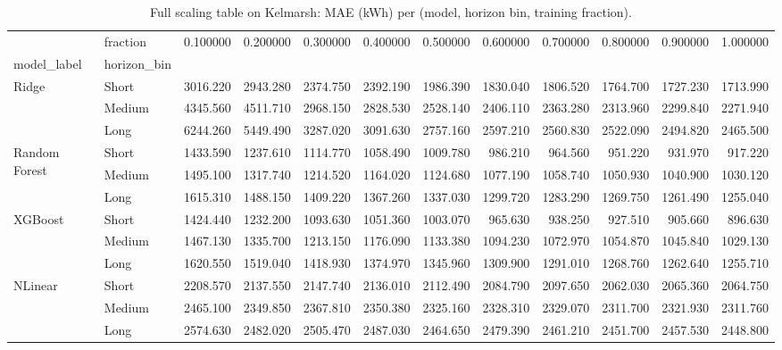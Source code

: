 \begin{table}[ht]
\caption{Full scaling table on Kelmarsh: MAE (kWh) per (model, horizon bin, training fraction).}
\label{tab:app_scaling_full}
\begin{tabular}{llrrrrrrrrrr}
\toprule
 & fraction & 0.100000 & 0.200000 & 0.300000 & 0.400000 & 0.500000 & 0.600000 & 0.700000 & 0.800000 & 0.900000 & 1.000000 \\
model_label & horizon_bin &  &  &  &  &  &  &  &  &  &  \\
\midrule
\multirow[t]{3}{*}{Ridge} & Short & 3016.220 & 2943.280 & 2374.750 & 2392.190 & 1986.390 & 1830.040 & 1806.520 & 1764.700 & 1727.230 & 1713.990 \\
 & Medium & 4345.560 & 4511.710 & 2968.150 & 2828.530 & 2528.140 & 2406.110 & 2363.280 & 2313.960 & 2299.840 & 2271.940 \\
 & Long & 6244.260 & 5449.490 & 3287.020 & 3091.630 & 2757.160 & 2597.210 & 2560.830 & 2522.090 & 2494.820 & 2465.500 \\
\cline{1-12}
\multirow[t]{3}{*}{Random Forest} & Short & 1433.590 & 1237.610 & 1114.770 & 1058.490 & 1009.780 & 986.210 & 964.560 & 951.220 & 931.970 & 917.220 \\
 & Medium & 1495.100 & 1317.740 & 1214.520 & 1164.020 & 1124.680 & 1077.190 & 1058.740 & 1050.930 & 1040.900 & 1030.120 \\
 & Long & 1615.310 & 1488.150 & 1409.220 & 1367.260 & 1337.030 & 1299.720 & 1283.290 & 1269.750 & 1261.490 & 1255.040 \\
\cline{1-12}
\multirow[t]{3}{*}{XGBoost} & Short & 1424.440 & 1232.200 & 1093.630 & 1051.360 & 1003.070 & 965.630 & 938.250 & 927.510 & 905.660 & 896.630 \\
 & Medium & 1467.130 & 1335.700 & 1213.150 & 1176.090 & 1133.380 & 1094.230 & 1072.970 & 1054.870 & 1045.840 & 1029.130 \\
 & Long & 1620.550 & 1519.040 & 1418.930 & 1374.970 & 1345.960 & 1309.900 & 1291.010 & 1268.760 & 1262.640 & 1255.710 \\
\cline{1-12}
\multirow[t]{3}{*}{NLinear} & Short & 2208.570 & 2137.550 & 2147.740 & 2136.010 & 2112.490 & 2084.790 & 2097.650 & 2062.030 & 2065.360 & 2064.750 \\
 & Medium & 2465.100 & 2349.850 & 2367.810 & 2350.380 & 2325.160 & 2328.310 & 2329.070 & 2311.700 & 2321.930 & 2311.760 \\
 & Long & 2574.630 & 2482.020 & 2505.470 & 2487.030 & 2464.650 & 2479.390 & 2461.210 & 2451.700 & 2457.530 & 2448.800 \\

\end{tabular}
\end{table}
